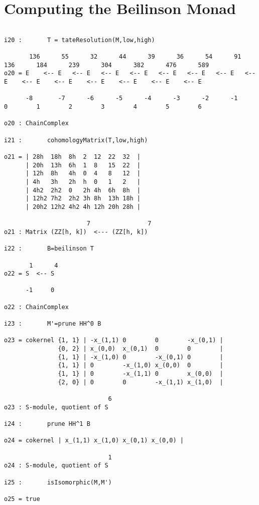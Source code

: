 \documentclass[twoside,12pt, leqno]{amsart}
\begin{document}
     
\section{Computing the Beilinson Monad}

\begin{verbatim}
 
i20 :       T = tateResolution(M,low,high) 

       136      55      32      44      39      36      54      91      136      184      239      304      382      476      589
o20 = E    <-- E   <-- E   <-- E   <-- E   <-- E   <-- E   <-- E   <-- E    <-- E    <-- E    <-- E    <-- E    <-- E    <-- E
                                                                                                                              
      -8       -7      -6      -5      -4      -3      -2      -1      0        1        2        3        4        5        6

o20 : ChainComplex

i21 :       cohomologyMatrix(T,low,high)

o21 = | 28h  18h  8h  2  12  22  32  |
      | 20h  13h  6h  1  8   15  22  |
      | 12h  8h   4h  0  4   8   12  |
      | 4h   3h   2h  h  0   1   2   |
      | 4h2  2h2  0   2h 4h  6h  8h  |
      | 12h2 7h2  2h2 3h 8h  13h 18h |
      | 20h2 12h2 4h2 4h 12h 20h 28h |

                       7                7
o21 : Matrix (ZZ[h, k])  <--- (ZZ[h, k])

i22 :       B=beilinson T

       1      4
o22 = S  <-- S
              
      -1     0

o22 : ChainComplex

i23 :       M'=prune HH^0 B

o23 = cokernel {1, 1} | -x_(1,1) 0        0        -x_(0,1) |
               {0, 2} | x_(0,0)  x_(0,1)  0        0        |
               {1, 1} | -x_(1,0) 0        -x_(0,1) 0        |
               {1, 1} | 0        -x_(1,0) x_(0,0)  0        |
               {1, 1} | 0        -x_(1,1) 0        x_(0,0)  |
               {2, 0} | 0        0        -x_(1,1) x_(1,0)  |

                             6
o23 : S-module, quotient of S

i24 :       prune HH^1 B

o24 = cokernel | x_(1,1) x_(1,0) x_(0,1) x_(0,0) |

                             1
o24 : S-module, quotient of S

i25 :       isIsomorphic(M,M')

o25 = true
  \end{verbatim}
\end{document}
